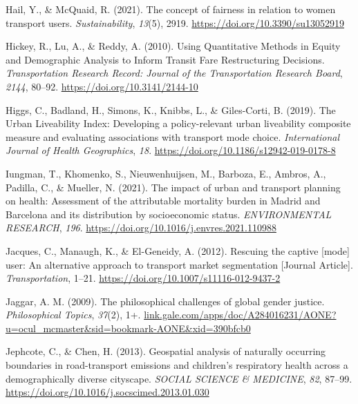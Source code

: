 \documentclass[
  letterpaper,
  DIV=11,
  numbers=noendperiod]{scrartcl}
\newlength{\cslhangindent}
\newenvironment{CSLReferences}[2] %
 {\begin{list}{}{%
  \setlength{\itemindent}{0pt}
  \setlength{\leftmargin}{0pt}
  \setlength{\parsep}{0pt}
  \ifodd #1
   \setlength{\leftmargin}{\cslhangindent}
   \setlength{\itemindent}{-1\cslhangindent}
  \fi
  \setlength{\itemsep}{#2\baselineskip}}}
 {\end{list}}
\begin{document}
\begin{CSLReferences}{1}{0}
Hail, Y., \& McQuaid, R. (2021). The concept of fairness in relation to
women transport users. \emph{Sustainability}, \emph{13}(5), 2919.
\url{https://doi.org/10.3390/su13052919}

Hickey, R., Lu, A., \& Reddy, A. (2010). Using {Quantitative Methods} in
{Equity} and {Demographic Analysis} to {Inform Transit Fare
Restructuring Decisions}. \emph{Transportation Research Record: Journal
of the Transportation Research Board}, \emph{2144}, 80--92.
\url{https://doi.org/10.3141/2144-10}

Higgs, C., Badland, H., Simons, K., Knibbs, L., \& Giles-Corti, B.
(2019). The {Urban Liveability Index}: Developing a policy-relevant
urban liveability composite measure and evaluating associations with
transport mode choice. \emph{International Journal of Health
Geographics}, \emph{18}. \url{https://doi.org/10.1186/s12942-019-0178-8}

Iungman, T., Khomenko, S., Nieuwenhuijsen, M., Barboza, E., Ambros, A.,
Padilla, C., \& Mueller, N. (2021). The impact of urban and transport
planning on health: {Assessment} of the attributable mortality burden in
{Madrid} and {Barcelona} and its distribution by socioeconomic status.
\emph{ENVIRONMENTAL RESEARCH}, \emph{196}.
\url{https://doi.org/10.1016/j.envres.2021.110988}

Jacques, C., Manaugh, K., \& El-Geneidy, A. (2012). Rescuing the captive
{[}mode{]} user: An alternative approach to transport market
segmentation {[}Journal Article{]}. \emph{Transportation}, 1--21.
\url{https://doi.org/10.1007/s11116-012-9437-2}

Jaggar, A. M. (2009). The philosophical challenges of global gender
justice. \emph{Philosophical Topics}, \emph{37}(2), 1+.
\href{https://link.gale.com/apps/doc/A284016231/AONE?u=ocul_mcmaster&sid=bookmark-AONE&xid=390bfcb0}{link.gale.com/apps/doc/A284016231/AONE?u=ocul\_mcmaster\&sid=bookmark-AONE\&xid=390bfcb0}

Jephcote, C., \& Chen, H. (2013). Geospatial analysis of naturally
occurring boundaries in road-transport emissions and children's
respiratory health across a demographically diverse cityscape.
\emph{SOCIAL SCIENCE \& MEDICINE}, \emph{82}, 87--99.
\url{https://doi.org/10.1016/j.socscimed.2013.01.030}


\end{CSLReferences}
\end{document}
